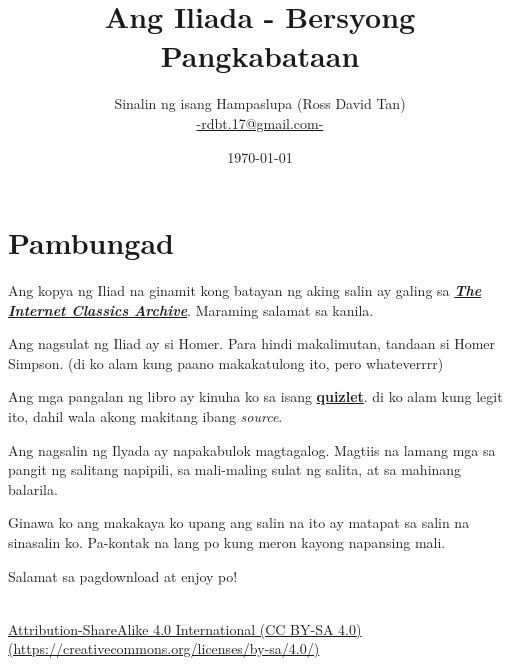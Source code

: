 \documentclass[12pt,letterpaper]{report}
\begin{document}
\title{\textbf{Ang Iliada - Bersyong Pangkabataan}}
\author{Sinalin ng isang Hampaslupa (Ross David Tan) \\ \href{mailto:rdbt.17@gmail.com}{-rdbt.17@gmail.com-}}
\date{\today}
\maketitle

\tableofcontents
\pagebreak

\setlength{\parskip}{1em}

\chapter*{Pambungad}
\begin{center}

    Ang kopya ng Iliad na ginamit kong batayan ng aking salin ay galing sa \href{http://classics.mit.edu/Homer/iliad.html}{\textbf{\textit{The Internet Classics Archive}}}. Maraming salamat sa kanila.


    Ang nagsulat ng Iliad ay si Homer. Para hindi makalimutan, tandaan si Homer Simpson. 
    (di ko alam kung paano makakatulong ito, pero whateverrrr)

    Ang mga pangalan ng libro ay kinuha ko sa isang \href{https://quizlet.com/24340225/titles-of-each-book-in-the-iliad-flash-cards/}{\textbf{quizlet}}.
    di ko alam kung legit ito, dahil wala akong makitang ibang \textit{source}.

    Ang nagsalin ng Ilyada ay napakabulok magtagalog. Magtiis na lamang mga sa pangit ng salitang napipili,
    sa mali-maling sulat ng salita, at sa mahinang balarila.

    Ginawa ko ang makakaya ko upang ang salin na ito ay matapat sa salin na sinasalin ko. Pa-kontak na lang po kung meron kayong napansing mali.

    Salamat sa pagdownload at enjoy po!
    \vspace*{\fill}
\end{center}
\pagebreak

\vspace*{\fill}
\begin{center}
    \href{https://creativecommons.org/licenses/by-sa/4.0/}{\ccbysa \\[0.5cm] Attribution-ShareAlike 4.0 International (CC BY-SA 4.0) \\ (https://creativecommons.org/licenses/by-sa/4.0/)}
    
\end{center}
\vspace*{\fill}
\end{document}
